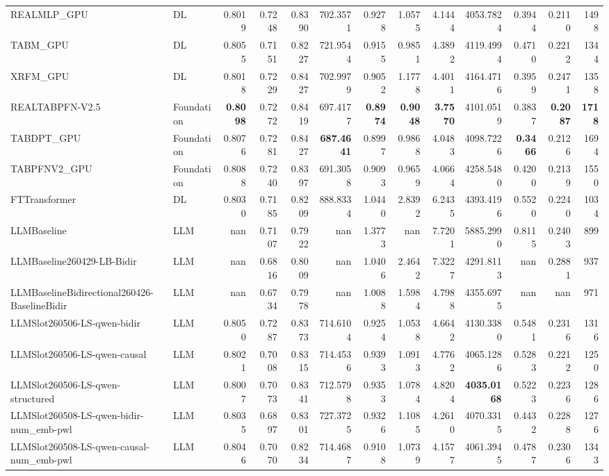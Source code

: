 \begin{table}[htbp]
{\begin{tabular}{ll|rrrrrrrrrr|r}
REALMLP\_GPU & DL & 0.8019 & 0.7248 & 0.8390 & 702.3571 & 0.9278 & 1.0575 & 4.1444 & 4053.7824 & 0.3944 & 0.2110 & 1498 \\
TABM\_GPU & DL & 0.8055 & 0.7151 & 0.8227 & 721.9544 & 0.9155 & 0.9851 & 4.3892 & 4119.4994 & 0.4710 & 0.2212 & 1344 \\
XRFM\_GPU & DL & 0.8018 & 0.7229 & 0.8427 & 702.9979 & 0.9052 & 1.1778 & 4.4011 & 4164.4716 & 0.3959 & 0.2471 & 1358 \\
REALTABPFN-V2.5 & Foundation & \textbf{0.8098} & 0.7272 & 0.8419 & 697.4177 & \textbf{0.8974} & \textbf{0.9048} & \textbf{3.7570} & 4101.0519 & 0.3837 & \textbf{0.2087} & \textbf{1718} \\
TABDPT\_GPU & Foundation & 0.8076 & 0.7281 & 0.8427 & \textbf{687.4641} & 0.8997 & 0.9868 & 4.0483 & 4098.7226 & \textbf{0.3466} & 0.2126 & 1694 \\
TABPFNV2\_GPU & Foundation & 0.8088 & 0.7240 & 0.8397 & 691.3058 & 0.9093 & 0.9659 & 4.0664 & 4258.5480 & 0.4200 & 0.2139 & 1550 \\
\midrule
FTTransformer & DL & 0.8030 & 0.7185 & 0.8209 & 888.8334 & 1.0440 & 2.8392 & 6.2435 & 4393.4196 & 0.5520 & 0.2240 & 1034 \\
LLMBaseline & LLM & nan & 0.7107 & 0.7922 & nan & 1.3773 & nan & 7.7201 & 5885.2990 & 0.8115 & 0.2403 & 899 \\
LLMBaseline260429-LB-Bidir & LLM & nan & 0.6816 & 0.8009 & nan & 1.0406 & 2.4642 & 7.3227 & 4291.8113 & nan & 0.2881 & 937 \\
LLMBaselineBidirectional260426-BaselineBidir & LLM & nan & 0.6734 & 0.7978 & nan & 1.0088 & 1.5984 & 4.7988 & 4355.6975 & nan & nan & 971 \\
LLMSlot260506-LS-qwen-bidir & LLM & 0.8050 & 0.7287 & 0.8373 & 714.6104 & 0.9254 & 1.0538 & 4.6642 & 4130.3380 & 0.5481 & 0.2316 & 1316 \\
LLMSlot260506-LS-qwen-causal & LLM & 0.8021 & 0.7008 & 0.8315 & 714.4536 & 0.9393 & 1.0913 & 4.7762 & 4065.1286 & 0.5283 & 0.2212 & 1250 \\
LLMSlot260506-LS-qwen-structured & LLM & 0.8007 & 0.7073 & 0.8341 & 712.5798 & 0.9353 & 1.0784 & 4.8204 & \textbf{4035.0168} & 0.5223 & 0.2236 & 1286 \\
LLMSlot260508-LS-qwen-bidir-num\_emb-pwl & LLM & 0.8035 & 0.6897 & 0.8301 & 727.3725 & 0.9326 & 1.1085 & 4.2610 & 4070.3315 & 0.4432 & 0.2288 & 1276 \\
LLMSlot260508-LS-qwen-causal-num\_emb-pwl & LLM & 0.8046 & 0.7070 & 0.8234 & 714.4687 & 0.9108 & 1.0739 & 4.1577 & 4061.3945 & 0.4787 & 0.2306 & 1343 \\

\end{tabular}}
\end{table}

